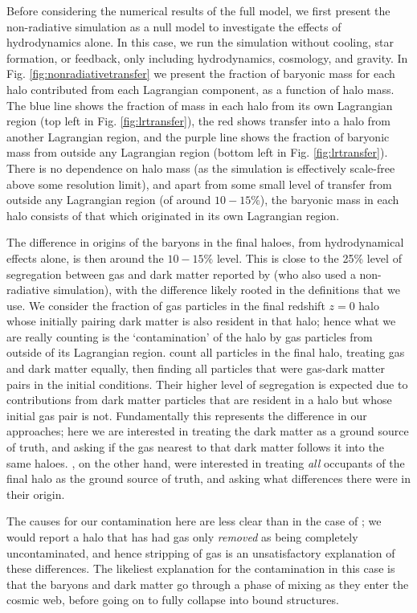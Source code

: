 \documentclass[fleqn,usenatbib]{mnras}
\begin{document}
Before considering the numerical results of the full model, we first present
the non-radiative simulation as a null model to investigate the effects of
hydrodynamics alone. In this case, we run the simulation without cooling,
star formation, or feedback, only including hydrodynamics, cosmology, and
gravity. In Fig. \ref{fig:nonradiativetransfer} we present the fraction of
baryonic mass for each halo contributed from each Lagrangian component, as a
function of halo mass. The blue line shows the fraction of mass in each halo
from its own Lagrangian region (top left in Fig. \ref{fig:lrtransfer}), the
red shows transfer into a halo from another Lagrangian region, and the purple
line shows the fraction of baryonic mass from outside any Lagrangian region
(bottom left in Fig. \ref{fig:lrtransfer}). There is no dependence on halo
mass (as the simulation is effectively scale-free above some resolution
limit), and apart from some small level of transfer from outside any
Lagrangian region (of around $10-15\%$), the baryonic mass in each halo
consists of that which originated in its own Lagrangian region.

The difference in origins of the baryons in the final haloes, from
hydrodynamical effects alone, is then around the $10-15\%$ level. This is
close to the 25\% level of segregation between gas and dark matter reported
by \citet{Liao2017} (who also used a non-radiative simulation), with the
difference likely rooted in the definitions that we use. We consider the
fraction of gas particles in the final redshift $z=0$ halo whose initially
pairing dark matter is also resident in that halo; hence what we are really
counting is the `contamination' of the halo by gas particles from outside of
its Lagrangian region. \citet{Liao2017} count all particles in the final
halo, treating gas and dark matter equally, then finding all particles that
were gas-dark matter pairs in the initial conditions. Their higher level of
segregation is expected due to contributions from dark matter particles that
are resident in a halo but whose initial gas pair is not. Fundamentally this
represents the difference in our approaches; here we are interested in
treating the dark matter as a ground source of truth, and asking if the gas
nearest to that dark matter follows it into the same haloes.
\citet{Liao2017}, on the other hand, were interested in treating \emph{all}
occupants of the final halo as the ground source of truth, and asking what
differences there were in their origin.

The causes for our contamination here are less clear than in the case of
\citet{Liao2017}; we would report a halo that has had gas only \emph{removed}
as being completely uncontaminated, and hence stripping of gas is
an unsatisfactory explanation of these differences. The likeliest explanation
for the contamination in this case is that the baryons and dark matter go through
a phase of mixing as they enter the cosmic web, before going on to fully
collapse into bound structures.
\end{document}
